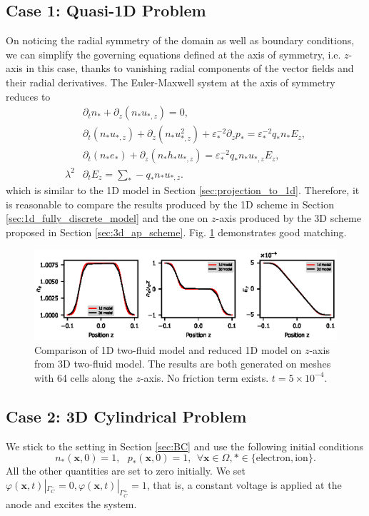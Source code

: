 \documentclass{article}
\begin{document}
\subsection{Case 1: Quasi-1D Problem}
On noticing the radial symmetry of the domain as well as boundary conditions, we can simplify the governing equations defined at the axis of symmetry, i.e. $z$-axis in this case, thanks to vanishing radial components of the vector fields and their radial derivatives. The Euler-Maxwell system at the axis of symmetry reduces to
\begin{align*}
    &\partial_t n_* + \partial_z(n_*u_{*,z}) = 0, \\
    &\partial_t (n_* u_{*,z}) + \partial_z(n_*u_{*,z}^2) + \varepsilon_*^{-2} \partial_z p_* = \varepsilon_*^{-2}q_*n_*E_z, \\
    &\partial_t (n_*e_*) + \partial_z (n_* h_* u_{*,z}) = \varepsilon_*^{-2} q_* n_* u_{*,z} E_z, \\
    \lambda^2 &\partial_t E_z = \sum_* - q_* n_* u_{*,z}.
\end{align*}
which is similar to the 1D model in Section \ref{sec:projection_to_1d}. Therefore, it is reasonable to compare the results produced by the 1D scheme in Section \ref{sec:1d_fully_discrete_model} and the one on $z$-axis produced by the 3D scheme proposed in Section \ref{sec:3d_ap_scheme}. Fig. \ref{fig:z_axis_reduction} demonstrates good matching. 
\begin{figure}
    \centering
    \includegraphics{z_axis_reduction.eps}
    \caption{Comparison of 1D two-fluid model and reduced 1D model on $z$-axis from 3D two-fluid model. The results are both generated on meshes with 64 cells along the $z$-axis. No friction term exists. $t = 5 \times 10^{-4}.$}
    \label{fig:z_axis_reduction}
\end{figure}

\subsection{Case 2: 3D Cylindrical Problem}

We stick to the setting in Section \ref{sec:BC} and use the following initial conditions
\begin{equation*}
    n_\ast(\mathbf{x}, 0) = 1, \ \ \  p_\ast(\mathbf{x},0) = 1, \ \ \forall \mathbf{x}\in\Omega, \ast \in \{\text{electron}, \text{ion}\}.
\end{equation*}
All the other quantities are set to zero initially. We set $\varphi(\mathbf{x}, t)|_{\Gamma_C^-} = 0, \varphi(\mathbf{x}, t)|_{\Gamma_C^+} = 1$, that is, a constant voltage is applied at the anode and excites the system. 
\end{document}
